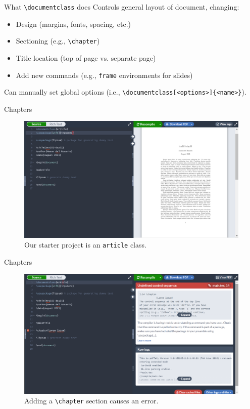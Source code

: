 \documentclass{beamer}
\begin{document}
{  \begin{frame}{What \texttt{\textbackslash documentclass} does}
    Controls general layout of document, changing:
    \begin{itemize}
      \item Design (margins, fonts, spacing, etc.)
      \item Sectioning (e.g., \texttt{\textbackslash chapter})
      \item Title location (top of page vs. separate page)
      \item Add new commands (e.g., \texttt{frame} environments for slides)
    \end{itemize}
    \pause
    Can manually set global options (i.e., \texttt{\textbackslash documentclass[<options>]\{<name>\}}).
  \end{frame}
  
  \begin{frame}{Chapters}
    \begin{figure}
      \includegraphics[width=0.9\linewidth]{day01-overleaf-07A-article.png}
      \caption{Our starter project is an \texttt{article} class.}
      \label{fig:day01-overleaf-07A}
    \end{figure}
  \end{frame}

  \begin{frame}{Chapters}
    \begin{figure}
      \includegraphics[width=0.9\linewidth]{day01-overleaf-07B-chapter-error.png}
      \caption{Adding a \texttt{\textbackslash chapter} section causes an error.}
      \label{fig:day01-overleaf-07B}
    \end{figure}
  \end{frame}

}
\end{document}

